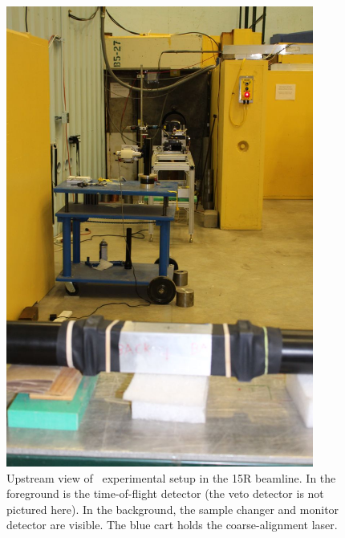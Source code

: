 \begin{figure}[ht!]
    \centering
    \includegraphics[width=0.9\textwidth]{figures/UpstreamFromTOFDetector.jpg}
    \caption[Overview of \tot\ experimental setup in the 15R beamline]
    {Upstream view of \tot\ experimental setup in the 15R beamline. In the foreground is the
    time-of-flight detector (the veto detector is not pictured here). In the background, the sample
changer and monitor detector are visible. The blue cart holds the coarse-alignment laser.}
    \label{BeamlineUpstream}
\end{figure}

